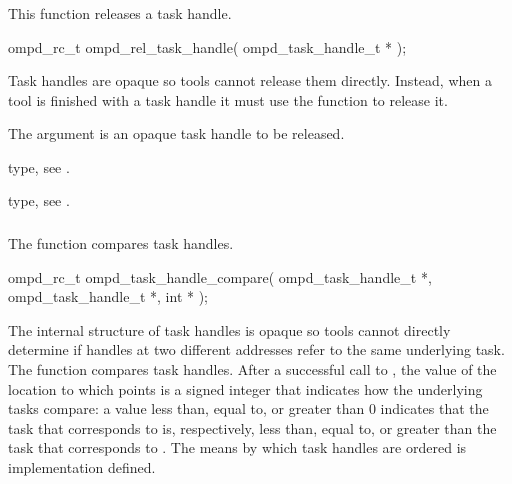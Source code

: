 \subsubsection{}
\label{subsubsubsec:ompd_rel_task_handle}
\summary
This  function releases a task handle.

\format
\begin{cspecific}
\begin{ompSyntax}
ompd_rc_t ompd_rel_task_handle(
  ompd_task_handle_t *
);
\end{ompSyntax}
\end{cspecific}

\descr
Task handles are opaque so tools cannot release them directly. Instead, 
when a tool is finished with a task handle it must use the 
 function to release it.

\argdesc
The  argument is an opaque task handle to be released.

\begin{crossrefs}
\item {} type, see .

\item {} type, see .
\end{crossrefs}



\subsubsection{}
\label{subsubsubsec:ompd_task_handle_compare}
\summary
The  function compares task handles.

\format
\begin{cspecific}
\begin{ompSyntax}
ompd_rc_t ompd_task_handle_compare(
  ompd_task_handle_t *,
  ompd_task_handle_t *,
  int *
);
\end{ompSyntax}
\end{cspecific}


\descr
The internal structure of task handles is opaque so tools  cannot directly
determine if handles at two different addresses refer to the same underlying 
task. The  function compares task handles.
After a successful call to , the value of 
the location to which  points is a signed integer that 
indicates how the underlying tasks compare: a value less than, equal to, 
or greater than 0 indicates that the task that corresponds to  
is, respectively, less than, equal to, or greater than the task that 
corresponds to . The means by which task handles are 
ordered is implementation defined.

